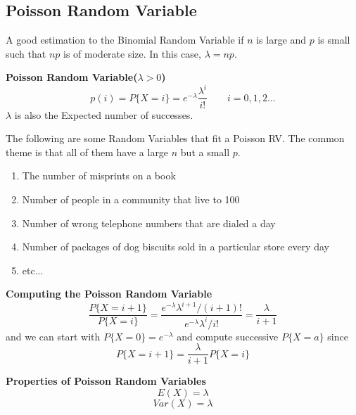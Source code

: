 \documentclass[10pt,a4paper]{article}
\begin{document}
               \subsection{Poisson Random Variable}
               A good estimation to the Binomial Random Variable if $n$ is large and $p$ is small such that $np$ is of moderate size. In this case, $\lambda = np$. 
               \begin{framed}
               	\centering\textbf{Poisson Random Variable($\lambda > 0$)}
                  $$p(i) = P\{X=i\} = e^{-\lambda}\frac{\lambda^{i}}{i!} \qquad i=0,1,2...$$ $\lambda$ is also the Expected number of successes.
               	
               \end{framed}
               The following are some Random Variables that fit a Poisson RV. The common theme is that all of them have a large $n$ but a small $p$.
               \begin{enumerate}
               \item The number of misprints on a book
               \item Number of people in a community that live to 100
               \item Number of wrong telephone numbers that are dialed a day
               \item Number of packages of dog biscuits sold in a particular store every day
               \item etc...
               \end{enumerate}
               \newpage 
               \begin{framed}
               	\centering\textbf{Computing the Poisson Random Variable}
               	$$\frac{P\{X=i+1\}}{P\{X=i\}}=\frac{e^{-\lambda}\lambda^{i+1}/(i+1)!}{e^{-\lambda}\lambda^{i}/i!}=\frac{\lambda}{i+1}$$
               	and we can start with $P\{X=0\} = e^{-\lambda}$ and compute successive $P\{X=a\}$ since $$P\{X=i+1\} = \frac{\lambda}{i+1}P\{X=i\}$$
               \end{framed}
               \begin{framed}
               	\centering\textbf{Properties of Poisson Random Variables}
               	$$E(X) = \lambda$$
               	$$Var(X) = \lambda$$
               \end{framed}
\end{document}
